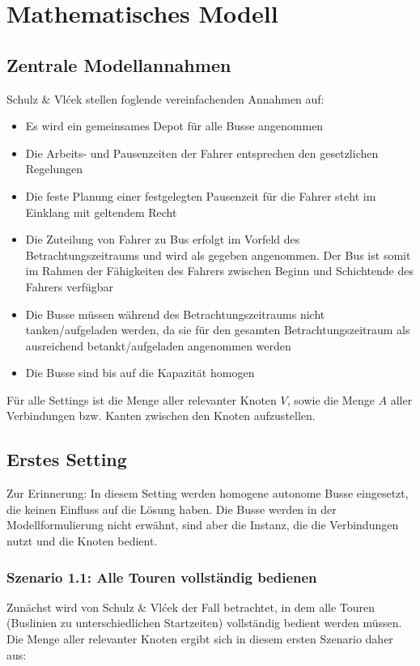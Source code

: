 \chapter{Mathematisches Modell}
\label{chapter:4}
\section{Zentrale Modellannahmen}
Schulz \& Vlćek stellen foglende vereinfachenden Annahmen auf:
\begin{itemize}
    \item Es wird ein gemeinsames Depot für alle Busse angenommen
    \item Die Arbeits- und Pausenzeiten der Fahrer entsprechen den gesetzlichen Regelungen
    \item Die feste Planung einer festgelegten Pausenzeit für die Fahrer steht im Einklang mit geltendem Recht
    \item Die Zuteilung von Fahrer zu Bus erfolgt im Vorfeld des Betrachtungszeitraums und wird als gegeben angenommen. Der Bus ist somit im Rahmen der Fähigkeiten des Fahrers zwischen Beginn und  Schichtende des Fahrers verfügbar
    \item Die Busse müssen während des Betrachtungszeitraums nicht tanken/aufgeladen werden, da sie für den gesamten Betrachtungszeitraum als ausreichend betankt/aufgeladen angenommen werden
    \item Die Busse sind bis auf die Kapazität homogen
\end{itemize}

Für alle Settings ist die Menge aller relevanter Knoten $V$, sowie die Menge $A$ aller Verbindungen bzw. Kanten zwischen den Knoten aufzustellen.

\section{Erstes Setting}
Zur Erinnerung: In diesem Setting werden homogene autonome Busse eingesetzt, die keinen Einfluss auf die Lösung haben. Die Busse werden in der Modellformulierung nicht erwähnt, sind aber die Instanz, die die Verbindungen nutzt und die Knoten bedient.
\label{sec:4.1}
\subsection{Szenario 1.1: Alle Touren vollständig bedienen}
\label{sec:4.1.1}
Zunächst wird von Schulz \& Vlćek der Fall betrachtet, in dem alle Touren (Buslinien zu unterschiedlichen Startzeiten) vollständig bedient werden müssen.
Die Menge aller relevanter Knoten ergibt sich in diesem ersten Szenario daher aus:

